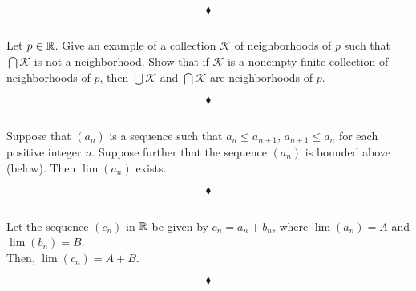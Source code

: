 $$\blacklozenge$$

\subsection{}
\begin{tcolorbox}
Let $p\in\mathbb{R}$. Give an example of a collection $\mathscr{K}$ of neighborhoods of $p$ such that $\bigcap\mathscr{K}$ is not a neighborhood. Show that if $\mathscr{K}$ is a nonempty finite collection of neighborhoods of $p$, then $\bigcup\mathscr{K}$ and $\bigcap\mathscr{K}$ are neighborhoods of $p$.
\end{tcolorbox}

$$\blacklozenge$$
\newpage



\renewcommand{\thesubsection}{\thesection.\arabic{subsection}}
\setcounter{subsection}{0}
\subsection{}
\begin{tcolorbox}
Suppose that $(a_n)$ is a sequence such that $a_n\leq a_{n+1}$, $a_{n+1}\leq a_{n}$ for each positive integer $n$. Suppose further that the sequence $(a_n)$ is bounded above (below). Then $\lim (a_n)$ exists. 
\end{tcolorbox}

$$\blacklozenge$$

\subsection{}
\begin{tcolorbox}
Let the sequence $(c_n)$ in $\mathbb{R}$ be given by $c_n = a_n+b_n$, where $\lim(a_n)= A$ and $\lim(b_n)= B$.\\
 Then, $\lim (c_n)= A +B$.
\end{tcolorbox}

$$\blacklozenge$$

